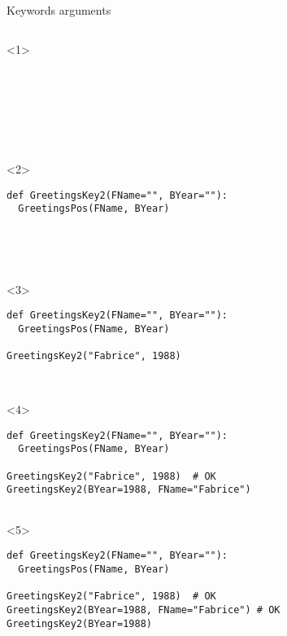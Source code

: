 \begin{frame}[fragile]{Keywords arguments}

  \begin{columns}[onlytextwidth]
    \begin{column}{\textwidth}

      \begin{onlyenv}<1>
        \begin{lstlisting}[style=python]







 \end{lstlisting}
      \end{onlyenv}

      \begin{onlyenv}<2>
        \begin{lstlisting}[style=python]
def GreetingsKey2(FName="", BYear=""):
  GreetingsPos(FName, BYear)





 \end{lstlisting}
      \end{onlyenv}

      \begin{onlyenv}<3>
        \begin{lstlisting}[style=python]
def GreetingsKey2(FName="", BYear=""):
  GreetingsPos(FName, BYear)

GreetingsKey2("Fabrice", 1988)



 \end{lstlisting}
      \end{onlyenv}

      \begin{onlyenv}<4>
        \begin{lstlisting}[style=python]
def GreetingsKey2(FName="", BYear=""):
  GreetingsPos(FName, BYear)

GreetingsKey2("Fabrice", 1988)  # OK
GreetingsKey2(BYear=1988, FName="Fabrice")


 \end{lstlisting}
      \end{onlyenv}

      \begin{onlyenv}<5>
        \begin{lstlisting}[style=python]
def GreetingsKey2(FName="", BYear=""):
  GreetingsPos(FName, BYear)

GreetingsKey2("Fabrice", 1988)  # OK
GreetingsKey2(BYear=1988, FName="Fabrice") # OK
GreetingsKey2(BYear=1988)


\end{lstlisting}
\end{onlyenv}
\end{column}
\end{columns}
\end{frame}
